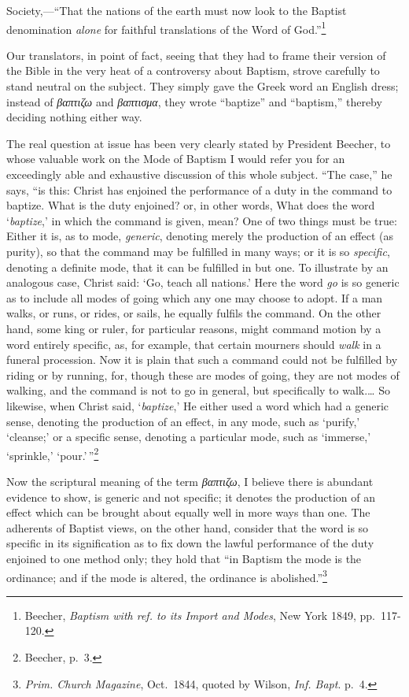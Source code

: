\documentclass[english,]{book}
\begin{document}
Society,---``That the nations of the earth must now look to the Baptist denomination \emph{alone} for faithful translations of the Word of God.''\footnote{Beecher, \emph{Baptism with ref. to its Import and Modes}, New York 1849, pp.~117-120.}

Our translators, in point of fact, seeing that they had to frame their version of the Bible in the very heat of a controversy about Baptism, strove carefully to stand neutral on the subject. They simply gave the Greek word an English dress; instead of \emph{βαπτιζω} and \emph{βαπτισμα}, they wrote ``baptize'' and ``baptism,'' thereby deciding nothing either way.

The real question at issue has been very clearly stated by President Beecher, to whose valuable work on the Mode of Baptism I would refer you for an exceedingly able and exhaustive discussion of this whole subject. ``The case,'' he says, ``is this: Christ has enjoined the performance of a duty in the command to baptize. What is the duty enjoined? or, in other words, What does the word `\emph{baptize},' in which the command is given, mean? One of two things must be true: Either it is, as to mode, \emph{generic}, denoting merely the production of an effect (as purity), so that the command may be fulfilled in many ways; or it is so \emph{specific}, denoting a definite mode, that it can be fulfilled in but one. To illustrate by an analogous case, Christ said: `Go, teach all nations.' Here the word \emph{go} is so generic as to include all modes of going which any one may choose to adopt. If a man walks, or runs, or rides, or sails, he equally fulfils the command. On the other hand, some king or ruler, for particular reasons, might command motion by a word entirely specific, as, for example, that certain mourners should \emph{walk} in a funeral procession. Now it is plain that such a command could not be fulfilled by riding or by running, for, though these are modes of going, they are not modes of walking, and the command is not to go in general, but specifically to walk.\ldots{} So likewise, when Christ said, `\emph{baptize},' He either used a word which had a generic sense, denoting the production of an effect, in any mode, such as `purify,' `cleanse;' or a specific sense, denoting a particular mode, such as `immerse,' `sprinkle,' `pour.'\,''\footnote{Beecher, p.~3.}

Now the scriptural meaning of the term \emph{βαπτιζω}, I believe there is abundant evidence to show, is generic and not specific; it denotes the production of an effect which can be brought about equally well in more ways than one. The adherents of Baptist views, on the other hand, consider that the word is so specific in its signification as to fix down the lawful performance of the duty enjoined to one method only; they hold that ``in Baptism the mode is the ordinance; and if the mode is altered, the ordinance is abolished.''\footnote{\emph{Prim. Church Magazine}, Oct.~1844, quoted by Wilson, \emph{Inf. Bapt}. p.~4.}
\end{document}
